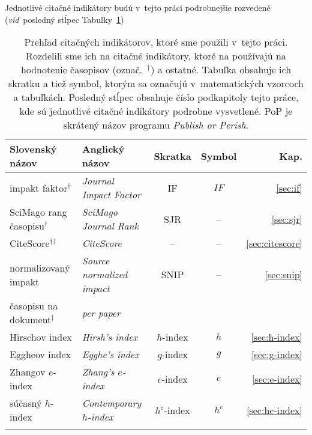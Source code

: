 Jednotlivé citačné indikátory budú v~tejto práci podrobnejšie rozvedené
(\emph{viď}~posledný stĺpec Tabuľky~\ref{tab:indicators.review})

\begin{table}
  \caption[Prehľad citačných indikátorov]%
  {Prehľad citačných indikátorov, ktoré sme použili v~tejto práci.  Rozdelili
    sme ich na citačné indikátory, ktoré na používajú na hodnotenie časopisov
    (označ.~$^\dagger$) a ostatné.  Tabuľka obsahuje ich skratku a tiež symbol,
    ktorým sa označujú v~matematických vzorcoch a tabuľkách.  Posledný stĺpec
     obsahuje číslo podkapitoly tejto práce, kde sú jednotlivé citačné
    indikátory podrobne vysvetlené.  PoP je skrátený názov programu
    \emph{Publish or Perish}.}
  \label{tab:indicators.review}
  \centering\small
  \begin{tabularx}{\textwidth}{llccr}
    \toprule
    Slovenský  názov & Anglický názov & Skratka & Symbol & Kap. \\
    \midrule
    impakt faktor$^\dagger$         & \emph{Journal Impact Factor}           & IF                  & $\mathit{IF}$     & \ref{sec:if}        \\[0.5ex]
    SciMago rang časopisu$^\dagger$ & \emph{SciMago Journal Rank}            & SJR                 & --                & \ref{sec:sjr}       \\[0.5ex]
    CiteScore$^\dagger$$^\ddagger$    & \emph{CiteScore}                       & --                  & --               & \ref{sec:citescore}  \\[0.5ex]
    normalizovaný impakt           & \emph{Source normalized impact}        & SNIP                & --                & \ref{sec:snip}      \\[-0.25ex]
    časopisu  na dokument$^\dagger$  & \emph{per paper}                       &                     &                   &                     \\[0.5ex]
    Hirschov index                 & \emph{Hirsh's index}                   & $h$-index           & $h$                & \ref{sec:h-index}  \\[1.5ex]
    Eggheov index                  & \emph{Egghe's index}                   & $g$-index           & $g$                & \ref{sec:g-index}  \\[0.5ex]
    Zhangov $e$-index              & \emph{Zhang's $e$-index}               & $e$-index           & $e$                & \ref{sec:e-index}  \\[0.5ex]
    súčasný $h$-index              & \emph{Contemporary $h$-index}          & $h^{\mathrm{c}}$-index & $h^{\mathrm{c}}$     & \ref{sec:hc-index}  \\[0.5ex]
$$
\end{tabularx}
\end{table}
